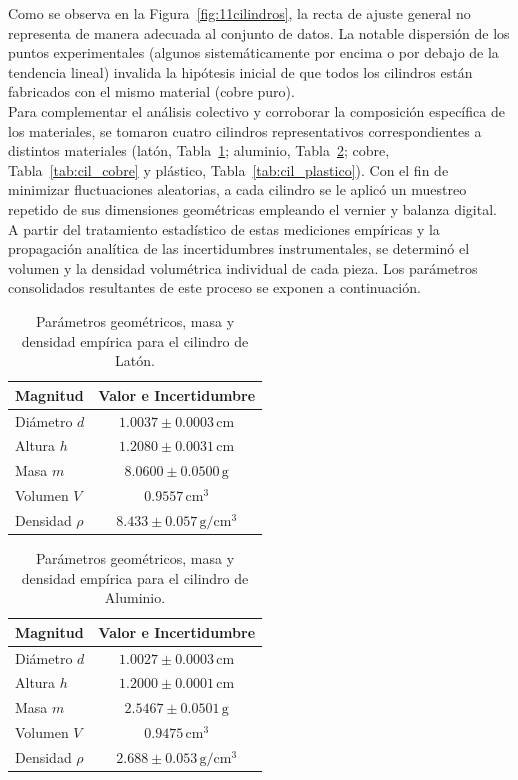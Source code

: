 \documentclass[10pt, letterpaper, twocolumn]{article}
\begin{document}
Como se observa en la Figura~\ref{fig:11cilindros}, la recta de ajuste general no representa de manera adecuada al conjunto de datos. La notable dispersión de los puntos experimentales (algunos sistemáticamente por encima o por debajo de la tendencia lineal) invalida la hipótesis inicial de que todos los cilindros están fabricados con el mismo material (cobre puro).\\
Para complementar el análisis colectivo y corroborar la composición específica de los materiales, se tomaron cuatro cilindros representativos correspondientes a distintos materiales (latón, Tabla~\ref{tab:cil_laton}; aluminio, Tabla~\ref{tab:cil_aluminio}; cobre, Tabla~\ref{tab:cil_cobre} y plástico, Tabla~\ref{tab:cil_plastico}). Con el fin de minimizar fluctuaciones aleatorias, a cada cilindro se le aplicó un muestreo repetido de sus dimensiones geométricas empleando el vernier y balanza digital. A partir del tratamiento estadístico de estas mediciones empíricas y la propagación analítica de las incertidumbres instrumentales, se determinó el volumen y la densidad volumétrica individual de cada pieza. Los parámetros consolidados resultantes de este proceso se exponen a continuación.

\begin{table}[htbp]
    \centering
    \caption{Parámetros geométricos, masa y densidad empírica para el cilindro de Latón.}
    \label{tab:cil_laton}
    \begin{tabular}{lc}
        \toprule
        \textbf{Magnitud} & \textbf{Valor e Incertidumbre} \\
        \midrule
        Diámetro $d$ & $1.0037 \pm 0.0003\,\mathrm{cm}$ \\
        Altura $h$ & $1.2080 \pm 0.0031\,\mathrm{cm}$ \\
        Masa $m$ & $8.0600 \pm 0.0500\,\mathrm{g}$ \\
        Volumen $V$ & $0.9557\,\mathrm{cm^3}$ \\
        Densidad $\rho$ & $8.433 \pm 0.057\,\mathrm{g/cm^3}$ \\
        \bottomrule
    \end{tabular}
\end{table}

\begin{table}[htbp]
    \centering
    \caption{Parámetros geométricos, masa y densidad empírica para el cilindro de Aluminio.}
    \label{tab:cil_aluminio}
    \begin{tabular}{lc}
        \toprule
        \textbf{Magnitud} & \textbf{Valor e Incertidumbre} \\
        \midrule
        Diámetro $d$ & $1.0027 \pm 0.0003\,\mathrm{cm}$ \\
        Altura $h$ & $1.2000 \pm 0.0001\,\mathrm{cm}$ \\
        Masa $m$ & $2.5467 \pm 0.0501\,\mathrm{g}$ \\
        Volumen $V$ & $0.9475\,\mathrm{cm^3}$ \\
        Densidad $\rho$ & $2.688 \pm 0.053\,\mathrm{g/cm^3}$ \\
        \bottomrule
    \end{tabular}
\end{table}
\end{document}
